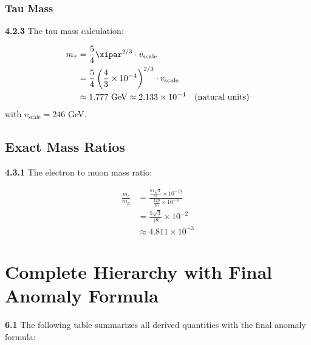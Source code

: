 	\subsubsection{Tau Mass}
	
	\noindent \textbf{4.2.3} The tau mass calculation:
	\begin{keyresult}
		\begin{align}
			m_\tau &= \frac{5}{4} \xipar^{2/3} \cdot v_{\text{scale}} \\
			&= \frac{5}{4} \left( \frac{4}{3} \times 10^{-4} \right)^{2/3} \cdot v_{\text{scale}} \\
			&\approx 1.777 \text{ GeV} \approx 2.133 \times 10^{-4} \quad \text{(natural units)}
		\end{align}
		with $v_{\text{scale}} = 246$ GeV.
	\end{keyresult}
	
	\subsection{Exact Mass Ratios}
	
	\noindent \textbf{4.3.1} The electron to muon mass ratio:
	\begin{keyresult}
		\begin{align}
			\frac{m_e}{m_\mu} &= \frac{\frac{64 \sqrt{3}}{81} \times 10^{-10}}{\frac{128}{45} \times 10^{-8}} \\
			&= \frac{5 \sqrt{3}}{18} \times 10^{-2} \\
			&\approx 4.811 \times 10^{-3}
		\end{align}
	\end{keyresult}
	


	\section{Complete Hierarchy with Final Anomaly Formula}
	
	\noindent \textbf{6.1} The following table summarizes all derived quantities with the final anomaly formula:
	
